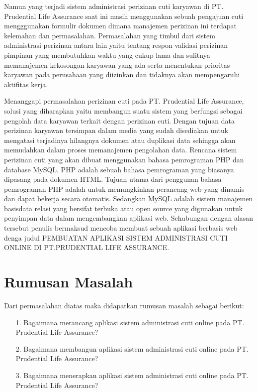 \documentclass{jtetiproposalskripsi}
\begin{document}
Namun yang terjadi sistem administrasi perizinan cuti karyawan di PT. Prudential Life Assurance saat ini masih menggunakan sebuah pengajuan cuti mengggunakan formulir dokumen dimana manajemen perizinan ini terdapat kelemahan dan permasalahan. Permasalahan yang timbul dari sistem administrasi perizinan antara lain yaitu tentang respon validasi perizinan pimpinan yang membutuhkan waktu yang cukup lama dan sulitnya memanajemen kekosongan karyawan yang ada serta menentukan prioritas karyawan pada perusahaan yang diizinkan dan tidaknya akan mempengaruhi aktifitas kerja. 

Menanggapi permasalahan perizinan cuti pada PT. Prudential Life Assurance, solusi yang diharapkan yaitu membangun suatu sistem yang berfungsi sebagai pengolah data karyawan terkait dengan perizinan cuti. Dengan tujuan data perizinan karyawan tersimpan dalam media yang sudah disediakan untuk mengatasi terjadinya hilangnya dokumen atau duplikasi data sehingga akan memudahkan dalam proses memanajemen pengolahan data. 
Rencana sistem perizinan cuti yang akan dibuat menggunakan bahasa pemrograman PHP dan database MySQL. PHP adalah sebuah bahasa pemrograman yang biasanya dipasang pada dokumen HTML. Tujuan utama dari penggunan bahasa pemrograman PHP adalah untuk memungkinkan perancang web yang dinamis dan dapat bekerja secara otomatis. Sedangkan MySQL adalah sistem manajemen basisdata relasi yang bersifat terbuka atau open source yang digunakan untuk penyimpan data dalam mengembangkan aplikasi web.  
Sehubungan dengan alasan tersebut penulis bermaksud mencoba membuat sebuah aplikasi berbasis web denga judul PEMBUATAN APLIKASI SISTEM ADMINISTRASI CUTI ONLINE DI PT.PRUDENTIAL LIFE ASSURANCE.


\section{Rumusan  Masalah}
Dari permasalahan diatas maka didapatkan rumusan masalah sebagai berikut:
\begin{itemize}
\item[1.] Bagaimana merancang aplikasi sistem administrasi cuti online pada PT. Prudential Life Assurance?
\item[2.]Bagaimana membangun aplikasi sistem administrasi cuti online pada PT. Prudential Life Assurance?
\item[3.]Bagaimana menerapkan aplikasi sistem administrasi cuti online pada PT. Prudential Life Assurance?
\end{itemize}
\end{document}
